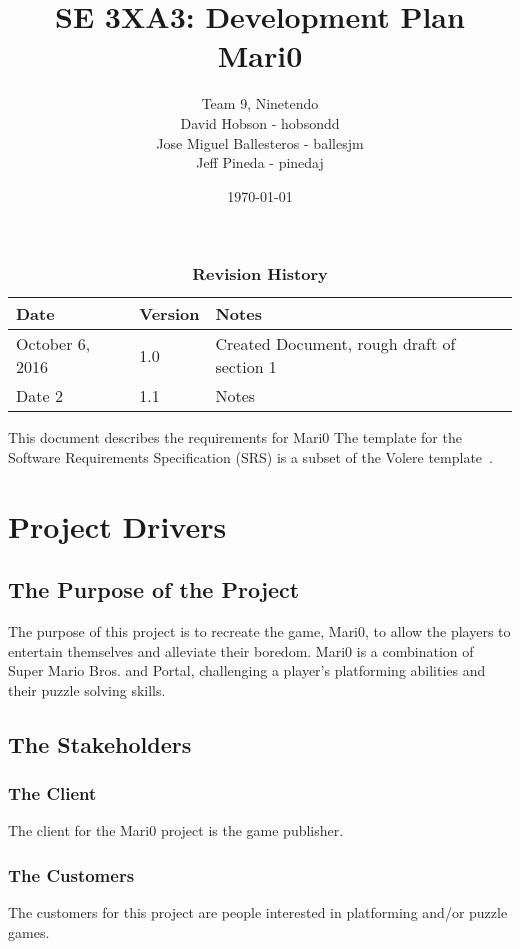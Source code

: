 \documentclass[12pt, titlepage]{article}
\title{SE 3XA3: Development Plan\\Mari0}
\author{Team 9, Ninetendo
		\\ David Hobson - hobsondd
		\\ Jose Miguel Ballesteros - ballesjm
		\\ Jeff Pineda - pinedaj
}
\date{\today}
\begin{document}
\maketitle

\tableofcontents
\listoftables
\listoffigures

\begin{table}[bp]
\caption{\bf Revision History}
\begin{tabularx}{\textwidth}{p{3cm}p{2cm}X}
\toprule {\bf Date} & {\bf Version} & {\bf Notes}\\
\midrule
October 6, 2016 & 1.0 & Created Document, rough draft of section 1\\
Date 2 & 1.1 & Notes\\
\bottomrule
\end{tabularx}
\end{table}

\newpage


This document describes the requirements for Mari0  The template for the Software
Requirements Specification (SRS) is a subset of the Volere
template~\citep{RobertsonAndRobertson2012}.

\section{Project Drivers}

\subsection{The Purpose of the Project}
The purpose of this project is to recreate the game, Mari0, to allow the players 
to entertain themselves and alleviate their boredom. Mari0 is a combination of
Super Mario Bros. and Portal, challenging a player's platforming abilities and their
puzzle solving skills.

\subsection{The Stakeholders}

\subsubsection{The Client}
The client for the Mari0 project is the game publisher.

\subsubsection{The Customers}
The customers for this project are people interested in platforming and/or puzzle games.
\end{document}
